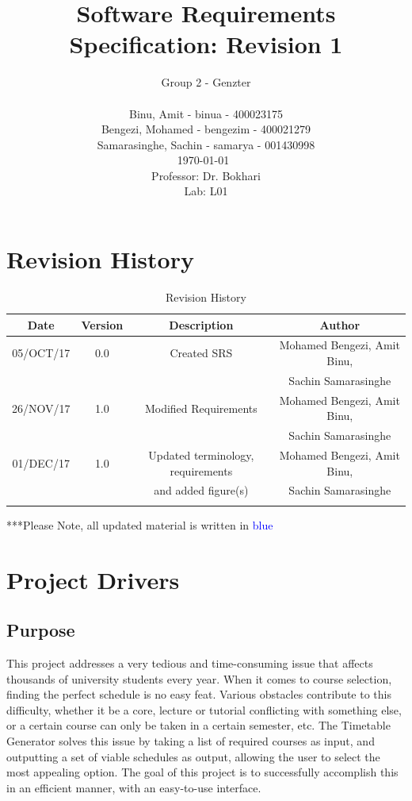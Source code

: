 \documentclass[12pt]{article}
\title{Software Requirements Specification: Revision 1}
\author{Group 2 - Genzter \\
		\\ Binu, Amit - binua - 400023175
		\\ Bengezi, Mohamed - bengezim - 400021279
		\\ Samarasinghe, Sachin - samarya - 001430998
		\\ \today\
		\\Professor: Dr. Bokhari
		\\ Lab: L01}
\begin{document}
\maketitle

\newpage

{\centering
  \tableofcontents\par
}

\listoftables
\listoffigures
\newpage

\section{Revision History}
\begin{table}[h]
\begin{center}
\begin{tabular}{ | c | c | c | c | }
\hline
 Date & Version & Description & Author \\ 
\hline
 05/OCT/17 & 0.0 & Created SRS & Mohamed Bengezi, Amit Binu, \\  
&&&  Sachin Samarasinghe \\
\hline
  26/NOV/17 & 1.0 & Modified Requirements & Mohamed Bengezi, Amit Binu, \\
&&&  Sachin Samarasinghe \\
\hline
  01/DEC/17 & 1.0 & Updated terminology, requirements & Mohamed Bengezi, Amit Binu, \\
  &&and added figure(s) & Sachin Samarasinghe \\
\hline 
 & & & \\ 
\hline 
\end{tabular}
\end{center}
\caption{Revision History}
\end{table}
***Please Note, all updated material is written in \textcolor{blue}{blue}
\newpage
\section{Project Drivers}
\subsection{Purpose}
\tab This project addresses a very tedious and time-consuming issue that affects thousands of university students every year. When it comes to course selection, finding the perfect schedule is no easy feat. Various obstacles contribute to this difficulty, whether it be a core, lecture or tutorial conflicting with something else, or a certain course can only be taken in a certain semester, etc. The Timetable Generator solves this issue by taking a list of required courses as input, and outputting a set of viable schedules as output, allowing the user to select the most appealing option. The goal of this project is to successfully accomplish this in an efficient manner, with an easy-to-use interface.
\end{document}
